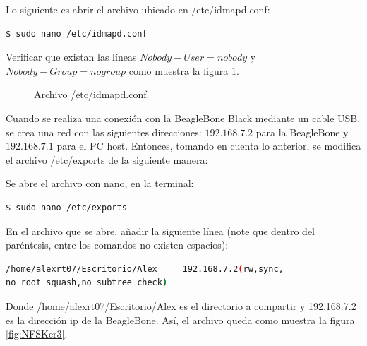 Lo siguiente es abrir el archivo ubicado en /etc/idmapd.conf:
\begin{lstlisting}[language=bash]
$ sudo nano /etc/idmapd.conf 
\end{lstlisting}

Verificar que existan las líneas $Nobody-User = nobody$ y $Nobody-Group = nogroup$ como muestra la figura \ref{fig:NFSKer2}.

\begin{figure}[H] %
\caption{Archivo /etc/idmapd.conf.}
\label{fig:NFSKer2}
\end{figure}

Cuando se realiza una conexión con la BeagleBone Black mediante un cable USB, se crea una red con las siguientes direcciones: $192.168.7.2$ para la BeagleBone y $192.168.7.1$ para el PC host. Entonces, tomando en cuenta lo anterior, se modifica el archivo /etc/exports de la siguiente manera:

Se abre el archivo con nano, en la terminal:

\begin{lstlisting}[language=bash]
$ sudo nano /etc/exports
\end{lstlisting}

En el archivo que se abre, añadir la siguiente línea (note que dentro del paréntesis, entre los comandos no existen espacios):

\begin{lstlisting}[language=bash]
/home/alexrt07/Escritorio/Alex     192.168.7.2(rw,sync,
no_root_squash,no_subtree_check)
\end{lstlisting}

Donde /home/alexrt07/Escritorio/Alex es el directorio a compartir y 192.168.7.2 es la dirección ip de la BeagleBone. Así, el archivo queda como muestra la figura \ref{fig:NFSKer3}.


